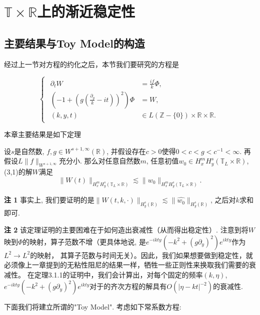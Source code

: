﻿\chapter{$\mathbb{T}\times \mathbb{R}$上的渐近稳定性}
\label{chap:example}
\section{主要结果与Toy Model的构造}

经过上一节对方程的约化之后，本节我们要研究的方程是

\begin{equation}
\begin{cases}
\begin{aligned}
\partial_t W&=\frac{if}{k}\Phi,\\
(-1+(g(\frac{\partial_y}{k}-it))^2)\Phi&=W, \\
(k,y,t)&\in L(\mathbb{Z}-\{0\})\times\mathbb{R}\times\mathbb{R}.
\end{aligned}
\end{cases}
\end{equation}

本章主要结果是如下定理


\begin{thm} \songti\rm 设$s$是自然数, $f,g\in W^{s+1,\infty}(\mathbb{R})$, 并假设存在$c>0$使得$0<c<g<c^{-1}<\infty$. 再假设$L\|f\|_{W^{s+1, \infty}}$充分小. 那么对任意自然数$m$, 任意初值$w_0\in H_x^mH_y^s(\mathbb{T}_L\times\mathbb{R})$, (3,1)的解$W$满足
\begin{equation}
\|W(t)\|_{H_x^mH_y^s(\mathbb{T}_L\times\mathbb{R})}\lesssim \|w_0\|_{H_x^mH_y^s(\mathbb{T}_L\times\mathbb{R})}.
\end{equation}
\end{thm}


\textbf{注 1 }事实上, 我们要证明的是$\|\hat{W}(t,k,\cdot)\|_{H_y^s(\mathbb{R})}\lesssim\|\hat{w_0}\|_{H_y^s(\mathbb{R})}$, 之后对$k$求和即可.

\textbf{注 2 }该定理证明的主要困难在于如何造出衰减性（从而得出稳定性）. 注意到将$W$映到$\Phi$的映射，算子范数不增（更具体地说, 是$e^{-ikty}(-k^2+(g\partial_y)^2)e^{ikty}$作为$L^2\rightarrow L^2$的映射， 其算子范数与时间无关）。因此，我们如果想要做到稳定性，就必须像上一章提到的无粘性阻尼的结果一样，牺牲一些正则性来换取我们需要的衰减性。 在定理3.1.1的证明中，我们会计算出，对每个固定的频率$(k,\eta)$, $e^{-ikty}(-k^2+(g\partial_y)^2)e^{ikty}$对于的齐次方程的解具有$O(|\eta-kt|^{-2})$的衰减性.

下面我们将建立所谓的"Toy Model". 考虑如下常系数方程:


